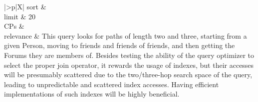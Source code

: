 \begin{tabularx}{\queryCardWidth}{|>{\queryPropertyCell}p{\queryPropertyCellWidth}|X|}
		sort		&
		\innerCardVSpace \\ \hline
	limit & 20 \\ \hline
	CPs &
	 \\ \hline
	relevance &
		\small This query looks for paths of length two and three, starting from a given Person, moving to friends and friends of
friends, and then getting the Forums they are members of. Besides testing the ability of the query optimizer to select
the proper join operator, it rewards the usage of indexes, but their accesses will be presumably scattered due to the
two/three-hop search space of the query, leading to unpredictable and scattered index accesses. Having efficient
implementations of such indexes will be highly beneficial.
 \\ \hline%
\end{tabularx}
\queryCardVSpace

\renewcommand{\emph}[1]{\oldemph{#1}}